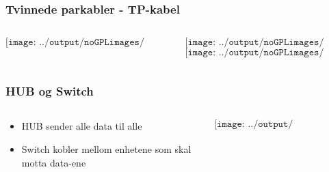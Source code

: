 \documentclass[aspectratio=169,xcolor=dvipsnames]{beamer}
\begin{document}
\begin{frame}
	\frametitle{Tvinnede parkabler - TP-kabel}
	\begin{columns}
		\begin{column}{0.5\textwidth}

	$$\texttt{[image: ../output/noGPLimages/kap5x14]}$$

			
		\end{column}

		\begin{column}{0.5\textwidth}
	$$\texttt{[image: ../output/noGPLimages/kap5x15]}$$
	$$\texttt{[image: ../output/noGPLimages/kap5x16]}$$
		\end{column}
	\end{columns}
\end{frame}
\begin{frame}
	\frametitle{HUB og Switch}
	\begin{columns}
		\begin{column}{0.5\textwidth}

			\begin{itemize}
				\item HUB sender alle data til alle     
				\item Switch kobler mellom enhetene som skal motta data-ene
			\end{itemize}

			
		\end{column}

		\begin{column}{0.5\textwidth}
	$$\texttt{[image: ../output/noGPLimages/kap5x17]}$$
		\end{column}
	\end{columns}
\end{frame}
\end{document}
